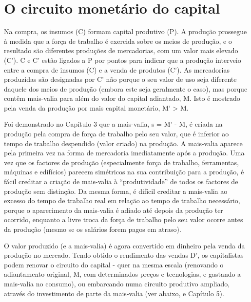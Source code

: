 \section{O circuito monetário do capital}
 \par 
Na compra, os insumos (C) formam capital produtivo (P). A produção prossegue à medida que a força de trabalho é exercida sobre os meios de produção, e o resultado são diferentes produções de mercadorias, com um valor mais elevado (C'). C e C' estão ligados a P por pontos para indicar que a produção interveio entre a compra de insumos (C) e a venda de produtos (C'). As mercadorias produzidas são designadas por C' não porque o seu valor de uso seja diferente daquele dos meios de produção (embora este seja geralmente o caso), mas porque contêm mais-valia para além do valor do capital adiantado, M. Isto é mostrado pela venda da produção por mais capital monetário, M' > M.
 \par 
Foi demonstrado no Capítulo {\color{blue}3} que a mais-valia, s = M' - M, é criada na produção pela compra de força de trabalho pelo seu valor, que é inferior ao tempo de trabalho despendido (valor criado) na produção. A mais-valia aparece pela primeira vez na forma de mercadoria imediatamente após a produção. Uma vez que os factores de produção (especialmente força de trabalho, ferramentas, máquinas e edifícios) parecem simétricos na sua contribuição para a produção, é fácil creditar a criação de mais-valia à “produtividade” de todos os factores de produção sem distinção. Da mesma forma, é difícil creditar a mais-valia ao excesso do tempo de trabalho real em relação ao tempo de trabalho necessário, porque o aparecimento da mais-valia é adiado até depois da produção ter ocorrido, enquanto a livre troca da força de trabalho pelo seu valor ocorre antes da produção (mesmo se os salários forem pagos em atraso).
 \par 
O valor produzido (e a mais-valia) é agora convertido em dinheiro pela venda da produção no mercado. Tendo obtido o rendimento das vendas D', os capitalistas podem renovar o circuito do capital - quer na mesma escala (renovando o adiantamento original, M, com determinados preços e tecnologias, e gastando a mais-valia no consumo), ou embarcando numa circuito produtivo ampliado, através do investimento de parte da mais-valia (ver abaixo, e Capítulo {\color{blue}5}).
 \par 
